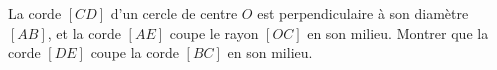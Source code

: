 La corde $[CD]$ d'un cercle de centre $O$ est perpendiculaire à son diamètre $[AB]$, et la corde $[AE]$ coupe le rayon $[OC]$ en son milieu. Montrer que la corde $[DE]$ coupe la corde $[BC]$ en son milieu.
